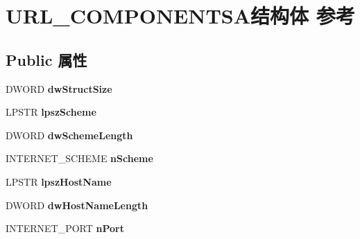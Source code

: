 \hypertarget{struct_u_r_l___c_o_m_p_o_n_e_n_t_s_a}{}\section{U\+R\+L\+\_\+\+C\+O\+M\+P\+O\+N\+E\+N\+T\+S\+A结构体 参考}
\label{struct_u_r_l___c_o_m_p_o_n_e_n_t_s_a}
\subsection*{Public 属性}
\begin{DoxyCompactItemize}
\item 
\mbox{\label{struct_u_r_l___c_o_m_p_o_n_e_n_t_s_a_a531f5c057397695ef066e1cfa0fb85a1}} 
D\+W\+O\+RD {\bfseries dw\+Struct\+Size}
\item 
\mbox{\label{struct_u_r_l___c_o_m_p_o_n_e_n_t_s_a_a1ca8dc475192aed3fc34b3185317eddb}} 
L\+P\+S\+TR {\bfseries lpsz\+Scheme}
\item 
\mbox{\label{struct_u_r_l___c_o_m_p_o_n_e_n_t_s_a_a3adf3f9f73628ccc3cfe5fffa5e0bdf7}} 
D\+W\+O\+RD {\bfseries dw\+Scheme\+Length}
\item 
\mbox{\label{struct_u_r_l___c_o_m_p_o_n_e_n_t_s_a_a1a33049371551325c4e2c4c510b07231}} 
I\+N\+T\+E\+R\+N\+E\+T\+\_\+\+S\+C\+H\+E\+ME {\bfseries n\+Scheme}
\item 
\mbox{\label{struct_u_r_l___c_o_m_p_o_n_e_n_t_s_a_ad2ecde494807ab0072017d4d340f6fdb}} 
L\+P\+S\+TR {\bfseries lpsz\+Host\+Name}
\item 
\mbox{\label{struct_u_r_l___c_o_m_p_o_n_e_n_t_s_a_ab3e83b9f4e0d38815dd7c4526e89b945}} 
D\+W\+O\+RD {\bfseries dw\+Host\+Name\+Length}
\item 
\mbox{\label{struct_u_r_l___c_o_m_p_o_n_e_n_t_s_a_aed5d6c074e0d0cca696f2308e1d008d1}} 
I\+N\+T\+E\+R\+N\+E\+T\+\_\+\+P\+O\+RT {\bfseries n\+Port}
\item 
\mbox{\label{struct_u_r_l___c_o_m_p_o_n_e_n_t_s_a_aa831788d754c951686faa83ad19a57f0}} 

\end{DoxyCompactItemize}
